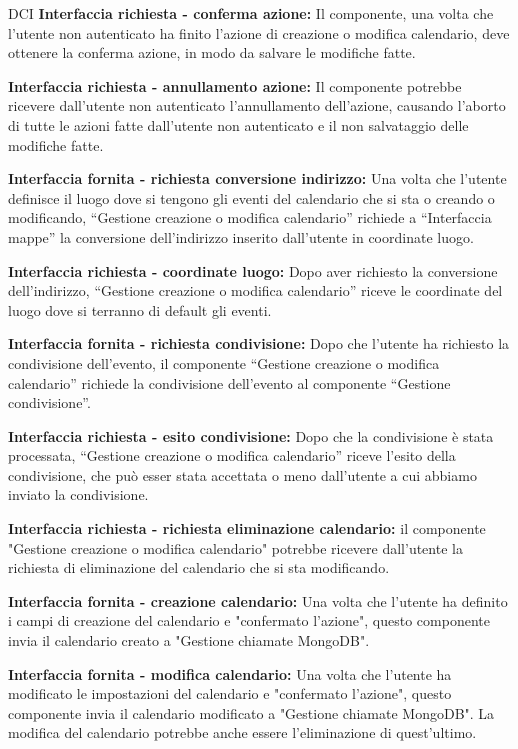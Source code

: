 \begin{listaPersonale}{DCI}
    \textbf{Interfaccia richiesta - conferma azione:} Il componente, una volta che l'utente non autenticato ha finito l'azione di creazione o modifica calendario,  deve ottenere la conferma azione, in modo da salvare le modifiche fatte.

    \textbf{Interfaccia richiesta - annullamento azione:} Il componente potrebbe ricevere dall'utente non autenticato l'annullamento dell'azione, causando l'aborto di tutte le azioni fatte dall'utente non autenticato e il non salvataggio delle modifiche fatte.

    \textbf{Interfaccia fornita - richiesta conversione indirizzo:} Una volta che l'utente definisce il luogo dove si tengono gli eventi del calendario che si sta o creando o modificando, “Gestione creazione o modifica calendario” richiede a “Interfaccia mappe” la conversione dell'indirizzo inserito dall'utente in coordinate luogo.

    \textbf{Interfaccia richiesta - coordinate luogo:} Dopo aver richiesto la conversione dell'indirizzo, “Gestione creazione o modifica calendario” riceve le coordinate del luogo dove si terranno di default gli eventi.

    \textbf{Interfaccia fornita - richiesta condivisione:} Dopo che l'utente ha richiesto la condivisione dell'evento, il componente “Gestione creazione o modifica calendario” richiede la condivisione dell'evento al componente “Gestione condivisione”.

    \textbf{Interfaccia richiesta - esito condivisione:} Dopo che la condivisione è stata processata, “Gestione creazione o modifica calendario” riceve l'esito della condivisione, che può esser stata accettata o meno dall'utente a cui abbiamo inviato la condivisione.

    \textbf{Interfaccia richiesta - richiesta eliminazione calendario:} il componente "Gestione creazione o modifica calendario" potrebbe ricevere dall'utente la richiesta di eliminazione del calendario che si sta modificando.

    \textbf{Interfaccia fornita - creazione calendario: } Una volta che l'utente ha definito i campi di creazione del calendario e "confermato l'azione", questo componente invia il calendario creato a "Gestione chiamate MongoDB".

    \textbf{Interfaccia fornita - modifica calendario: } Una volta che l'utente ha modificato le impostazioni del calendario e "confermato l'azione", questo componente invia il calendario modificato a "Gestione chiamate MongoDB". La modifica del calendario potrebbe anche essere l'eliminazione di quest'ultimo.


\end{listaPersonale}
